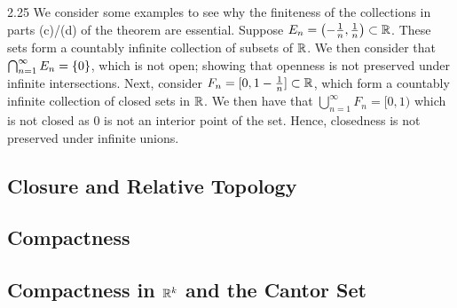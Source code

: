\begin{example}{}{2.25}
    We consider some examples to see why the finiteness of the collections in parts (c)/(d) of the theorem are essential. Suppose $E_n = \left(-\frac{1}{n}, \frac{1}{n}\right) \subset \mathbb{R}$. These sets form a countably infinite collection of subsets of $\mathbb{R}$. We then consider that $\bigcap_{n=1}^\infty E_n = \set{0}$, which is not open; showing that openness is not preserved under infinite intersections. Next, consider $F_n = [0, 1-\frac{1}{n}] \subset \mathbb{R}$, which form a countably infinite collection of closed sets in $\mathbb{R}$. We then have that $\bigcup_{n=1}^\infty F_n = [0, 1)$ which is not closed as $0$ is not an interior point of the set. Hence, closedness is not preserved under infinite unions. 
\end{example}

\subsection{Closure and Relative Topology}
\subsection{Compactness}
\subsection{Compactness in \texorpdfstring{$\mathbb{R}^k$}{TEXT} and the Cantor Set}
